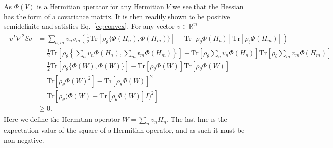 \documentclass[
    aps,
    prx,
    floatfix,
    nofootinbib,
    onecolumn
]{revtex4-2}
\newcommand{\Tr}{\mathrm{Tr}}
\begin{document}
As $ \Phi(V)$ is a Hermitian operator for any Hermitian $V$ we see that the Hessian has the form of a covariance matrix. It is then readily shown to be positive semidefinite and satisfies Eq.~\eqref{eq:convex}. For any vector $v \in \mathbb{R}^m$
\begin{align}
\begin{split}
\label{eq:positive_semidefinite}
    v^T \nabla^2 S v &=  \sum_{n,m} v_n v_m \left( \frac{1}{2} \Tr[ \rho_\theta \{ \Phi(H_n), \Phi(H_m) \}] - \Tr[ \rho_\theta \Phi(H_n)] \Tr[ \rho_\theta \Phi(H_m)] \right) \\
    &= \frac{1}{2} \Tr[ \rho_\theta \left\{ \sum_n v_n \Phi(H_n), \sum_m v_m \Phi(H_m) \right\}] - \Tr[ \rho_\theta \sum_n v_n \Phi(H_n)] \Tr[ \rho_\theta \sum_m v_m \Phi(H_m)] \\
    &= \frac{1}{2} \Tr[ \rho_\theta \{ \Phi(W), \Phi(W) \}] - \Tr[ \rho_\theta \Phi(W)] \Tr[ \rho_\theta \Phi(W)] \\
    &= \Tr[ \rho_\theta \Phi(W)^2 ] - \Tr[ \rho_\theta \Phi(W)]^2 \\
    &= \Tr[ \rho_\theta \big( \Phi(W) - \Tr[ \rho_\theta \Phi(W)] I \big )^2 ] \\
    &\geq 0 .
\end{split}
\end{align} 
Here we define the Hermitian operator $W = \sum_n v_n H_n$. The last line is the expectation value of the square of a Hermitian operator, and as such it must be non-negative.
\end{document}
